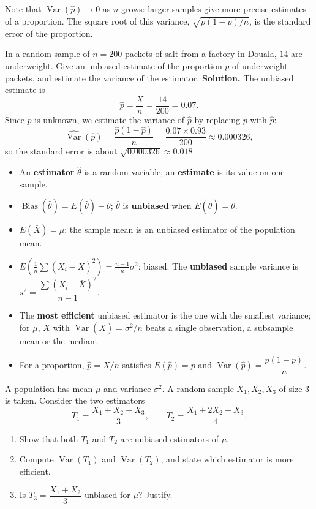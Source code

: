 \documentclass[11pt]{article}
\newcommand{\cle}[1]{{\popxbold\color{popdark}#1}}
\begin{document}
Note that $\operatorname{Var}(\hat{p}) \to 0$ as $n$ grows: larger samples give more precise estimates of a proportion. The square root of this variance, $\sqrt{p(1-p)/n}$, is the \cle{standard error} of the proportion.

\begin{exoresolu}
In a random sample of $n = 200$ packets of salt from a factory in Douala, $14$ are underweight. Give an unbiased estimate of the proportion $p$ of underweight packets, and estimate the variance of the estimator.
\tcblower
\textbf{Solution.} The unbiased estimate is
\[
\hat{p} = \frac{X}{n} = \frac{14}{200} = 0.07.
\]
Since $p$ is unknown, we estimate the variance of $\hat{p}$ by replacing $p$ with $\hat{p}$:
\[
\widehat{\operatorname{Var}}(\hat{p}) = \frac{\hat{p}(1-\hat{p})}{n} = \frac{0.07 \times 0.93}{200} \approx 0.000326,
\]
so the standard error is about $\sqrt{0.000326} \approx 0.018$.
\end{exoresolu}

\begin{aretenir}
\begin{itemize}
\item An \textbf{estimator} $\hat{\theta}$ is a random variable; an \textbf{estimate} is its value on one sample.
\item $\operatorname{Bias}(\hat{\theta}) = E(\hat{\theta}) - \theta$; $\hat{\theta}$ is \textbf{unbiased} when $E(\hat{\theta}) = \theta$.
\item $E(\bar{X}) = \mu$: the sample mean is an unbiased estimator of the population mean.
\item $E\!\left(\frac{1}{n}\sum(X_{i}-\bar{X})^{2}\right) = \frac{n-1}{n}\sigma^{2}$: biased. The \textbf{unbiased} sample variance is $s^{2} = \dfrac{\sum(X_{i}-\bar{X})^{2}}{n-1}$.
\item The \textbf{most efficient} unbiased estimator is the one with the smallest variance; for $\mu$, $\bar{X}$ with $\operatorname{Var}(\bar{X}) = \sigma^{2}/n$ beats a single observation, a subsample mean or the median.
\item For a proportion, $\hat{p} = X/n$ satisfies $E(\hat{p}) = p$ and $\operatorname{Var}(\hat{p}) = \dfrac{p(1-p)}{n}$.
\end{itemize}
\end{aretenir}

\begin{exercice}
A population has mean $\mu$ and variance $\sigma^{2}$. A random sample $X_{1}, X_{2}, X_{3}$ of size $3$ is taken. Consider the two estimators
\[
T_{1} = \frac{X_{1}+X_{2}+X_{3}}{3}, \qquad T_{2} = \frac{X_{1}+2X_{2}+X_{3}}{4}.
\]
\begin{enumerate}
\item Show that both $T_{1}$ and $T_{2}$ are unbiased estimators of $\mu$.
\item Compute $\operatorname{Var}(T_{1})$ and $\operatorname{Var}(T_{2})$, and state which estimator is more efficient.
\item Is $T_{3} = \dfrac{X_{1}+X_{2}}{3}$ unbiased for $\mu$? Justify.
\end{enumerate}
\end{exercice}
\end{document}
